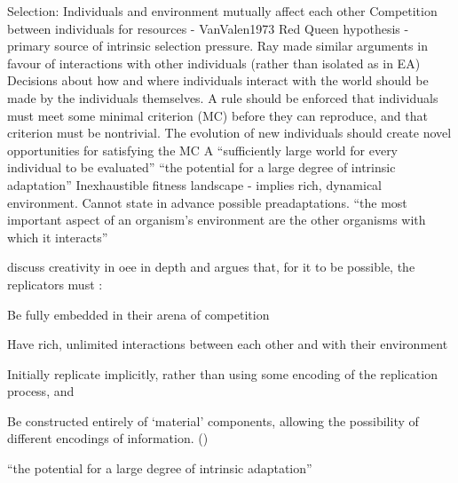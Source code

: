 Selection:
Individuals and environment mutually affect each other \parencite{Taylor2001}
Competition between individuals for resources - VanValen1973 Red Queen hypothesis - primary source of intrinsic selection pressure. \parencite{Taylor2001}
Ray made similar arguments in favour of interactions with other individuals (rather than isolated as in EA) 
Decisions about how and where individuals interact with the world should be made by the individuals themselves. \parencite{Soros2014}
A rule should be enforced that individuals must meet some minimal criterion (MC) before they can reproduce, and that criterion must be nontrivial.\parencite{Soros2014}
The evolution of new individuals should create novel opportunities for satisfying the MC \parencite{Soros2014}
A ``sufficiently large world for every individual to be evaluated'' \parencite{Soros2014}
``the potential for a large degree of intrinsic adaptation'' \parencite{Taylor2001}
Inexhaustible fitness landscape - implies rich, dynamical environment. \parencite{Vasas2015}
Cannot state in advance possible preadaptations. \parencite{Vasas2015}
``the most important aspect of an organism's environment are the other organisms with which it interacts'' \parencite{Maley1999}


\Textcite{Taylor2001,Taylor:1999sc} discuss creativity in \gls{oee} in depth and argues that, for it to be possible, the replicators must \parencite{Hutton2004}:
\begin{compactenum}
	\item Be fully embedded in their arena of competition 
	\item Have rich, unlimited interactions between each other and with their environment 
	\item Initially replicate implicitly, rather than using some encoding of the replication process, and 
	\item Be constructed entirely of `material' components, allowing the possibility of different encodings of information. ()
\end{compactenum}

``the potential for a large degree of intrinsic adaptation'' \parencite{Taylor2001}

